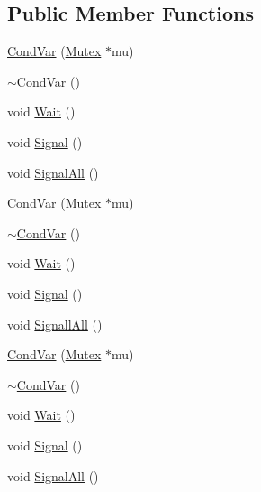 \subsection*{Public Member Functions}
\begin{DoxyCompactItemize}
\item 
\hyperlink{classleveldb_1_1port_1_1_cond_var_abb23c74c7b58298a20d4cfd6a0c5839a}{Cond\+Var} (\hyperlink{classleveldb_1_1port_1_1_mutex}{Mutex} $\ast$mu)
\item 
\hyperlink{classleveldb_1_1port_1_1_cond_var_abf5e80198afeeccf1ee1b9af848d0cf6}{$\sim$\+Cond\+Var} ()
\item 
void \hyperlink{classleveldb_1_1port_1_1_cond_var_a9e9855595a3f3a3ccf47949696065597}{Wait} ()
\item 
void \hyperlink{classleveldb_1_1port_1_1_cond_var_ac36a2038b058b24886741c99e4a7d7d4}{Signal} ()
\item 
void \hyperlink{classleveldb_1_1port_1_1_cond_var_ad7725662f3c1bc542100c41081d1428a}{Signal\+All} ()
\item 
\hyperlink{classleveldb_1_1port_1_1_cond_var_abb23c74c7b58298a20d4cfd6a0c5839a}{Cond\+Var} (\hyperlink{classleveldb_1_1port_1_1_mutex}{Mutex} $\ast$mu)
\item 
\hyperlink{classleveldb_1_1port_1_1_cond_var_abf5e80198afeeccf1ee1b9af848d0cf6}{$\sim$\+Cond\+Var} ()
\item 
void \hyperlink{classleveldb_1_1port_1_1_cond_var_a9e9855595a3f3a3ccf47949696065597}{Wait} ()
\item 
void \hyperlink{classleveldb_1_1port_1_1_cond_var_ac36a2038b058b24886741c99e4a7d7d4}{Signal} ()
\item 
void \hyperlink{classleveldb_1_1port_1_1_cond_var_a516114902b0ac99e541d74f182faa7b4}{Signall\+All} ()
\item 
\hyperlink{classleveldb_1_1port_1_1_cond_var_abb23c74c7b58298a20d4cfd6a0c5839a}{Cond\+Var} (\hyperlink{classleveldb_1_1port_1_1_mutex}{Mutex} $\ast$mu)
\item 
\hyperlink{classleveldb_1_1port_1_1_cond_var_abf5e80198afeeccf1ee1b9af848d0cf6}{$\sim$\+Cond\+Var} ()
\item 
void \hyperlink{classleveldb_1_1port_1_1_cond_var_a9e9855595a3f3a3ccf47949696065597}{Wait} ()
\item 
void \hyperlink{classleveldb_1_1port_1_1_cond_var_ac36a2038b058b24886741c99e4a7d7d4}{Signal} ()
\item 
void \hyperlink{classleveldb_1_1port_1_1_cond_var_ad7725662f3c1bc542100c41081d1428a}{Signal\+All} ()
\end{DoxyCompactItemize}
